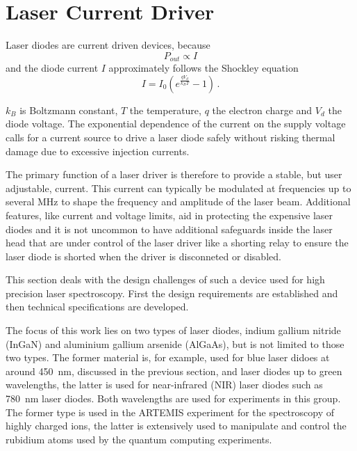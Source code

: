 \clearpage
\section{Laser Current Driver}%
\label{sec:laser_current_driver}
Laser diodes are current driven devices, because
\begin{equation*}
    P_{out} \propto I
\end{equation*}
and the diode current $I$ approximately follows the Shockley equation \cite{shockley_diode}
\begin{equation}
    I = I_0 \left( e^{\frac{qV_d}{k_B T}} - 1\right) \, . \label{eqn:shockley}
\end{equation}

$k_B$ is Boltzmann constant, $T$ the temperature, $q$ the electron charge and $V_d$ the diode voltage. The exponential dependence of the current on the supply voltage calls for a current source to drive a laser diode safely without risking thermal damage due to excessive injection currents.

The primary function of a laser driver is therefore to provide a stable, but user adjustable, current. This current can typically be modulated at frequencies up to several \unit{\MHz} to shape the frequency and amplitude of the laser beam. Additional features, like current and voltage limits, aid in protecting the expensive laser diodes and it is not uncommon to have additional safeguards inside the laser head that are under control of the laser driver like a shorting relay to ensure the laser diode is shorted when the driver is disconneted or disabled.

This section deals with the design challenges of such a device used for high precision laser spectroscopy. First the design requirements are established and then technical specifications are developed.

The focus of this work lies on two types of laser diodes, indium gallium nitride (InGaN) and aluminium gallium arsenide (AlGaAs), but is not limited to those two types. The former material is, for example, used for blue laser didoes at around \qty{450}{\nm}, discussed in the previous section, and laser diodes up to green wavelengths, the latter is used for near-infrared (NIR) laser diodes such as \qty{780}{\nm} laser diodes. Both wavelengths are used for experiments in this group. The former type is used in the ARTEMIS experiment for the spectroscopy of highly charged ions, the latter is extensively used to manipulate and control the rubidium atoms used by the quantum computing experiments.

